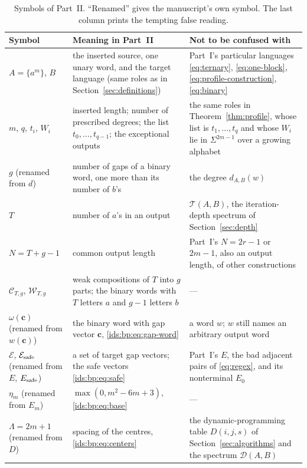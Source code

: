 \documentclass[11pt,letterpaper]{article}
\theoremstyle{definition}\newtheorem{definition}[theorem]{Definition}
\theoremstyle{remark}\newtheorem{remark}[theorem]{Remark}
\theoremstyle{definition}\newtheorem{question}[theorem]{Question}
\newcommand{\spec}[2]{\mathcal D(#1,#2)}
\newcommand{\bpgap}[1]{\omega(#1)}
\newcommand{\bpC}[2]{\mathcal C_{#1,#2}}
\newcommand{\bpW}[2]{\mathcal W_{#1,#2}}
\newcommand{\bpE}{\mathcal E}
\begin{document}
\begin{table}[htbp]
\centering\small\renewcommand{\arraystretch}{1.15}
\caption{Symbols of Part~II. ``Renamed'' gives the manuscript's own symbol.
The last column prints the tempting false reading.}
\label{ids:bp:tab:notation}
\begin{tabular}{>{\raggedright}p{.19\linewidth}>{\raggedright}p{.39\linewidth}>{\raggedright\arraybackslash}p{.34\linewidth}}
\toprule
Symbol & Meaning in Part~II & Not to be confused with\\
\midrule
$A=\{a^m\}$, $B$ & the inserted source, one unary word, and the target
 language (same roles as in Section~\ref{sec:definitions}) & Part~I's
 particular languages \eqref{eq:ternary}, \eqref{eq:one-block},
 \eqref{eq:profile-construction}, \eqref{eq:binary}\\
$m$, $q$, $t_i$, $W_i$ & inserted length; number of prescribed degrees; the
 list $t_0,\ldots,t_{q-1}$; the exceptional outputs & the same roles in
 Theorem~\ref{thm:profile}, whose list is $t_1,\ldots,t_q$ and whose $W_i$
 lie in $\Sigma^{2m-1}$ over a growing alphabet\\
$g$ (renamed from $d$) & number of gaps of a binary word, one more than its
 number of $b$'s & the degree $d_{A,B}(w)$\\
$T$ & number of $a$'s in an output & $\mathcal T(A,B)$, the
 iteration-depth spectrum of Section~\ref{sec:depth}\\
$N=T+g-1$ & common output length & Part~I's $N=2r-1$ or $2m-1$, also an output
 length, of other constructions\\
$\bpC{T}{g}$, $\bpW{T}{g}$ & weak compositions of $T$ into $g$ parts; the
 binary words with $T$ letters $a$ and $g-1$ letters $b$ & ---\\
$\bpgap{\mathbf c}$ (renamed from $w(\mathbf c)$) & the binary word with gap
 vector $\mathbf c$, \eqref{ids:bp:eq:gap-word} & a word $w$; $w$ still names
 an arbitrary output word\\
$\bpE$, $\bpE_{\rm safe}$ (renamed from $E$, $E_{\rm safe}$) & a set of
 target gap vectors; the safe vectors \eqref{ids:bp:eq:safe} & Part~I's $E$,
 the bad adjacent pairs of \eqref{eq:regex}, and its nonterminal $E_0$\\
$\eta_m$ (renamed from $E_m$) & $\max(0,m^2-6m+3)$, \eqref{ids:bp:eq:base} &
 ---\\
$\Lambda=2m+1$ (renamed from $D$) & spacing of the centres,
 \eqref{ids:bp:eq:centers} & the dynamic-programming table $D(i,j,s)$ of
 Section~\ref{sec:algorithms} and the spectrum $\spec{A}{B}$\\

\end{tabular}
\end{table}
\end{document}
